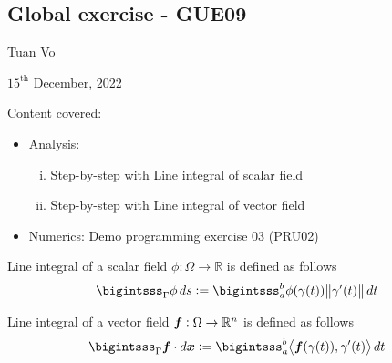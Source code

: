 \documentclass[12pt]{article}
\begin{document}
\begin{center}
	\section*{Global exercise - GUE09}
\end{center}
\begin{center}
	Tuan Vo
\end{center}
\begin{center}
	$15^{\text{th}}$ December, 2022
\end{center}
Content covered:
\begin{itemize}
	\item[\checkmark] Analysis:
		\begin{enumerate}[(i)]
			\item Step-by-step with Line integral of scalar field
			\item Step-by-step with Line integral of vector field
		\end{enumerate}
	\item[\checkmark] Numerics: Demo programming exercise 03 (PRU02)
\end{itemize}
\begin{recallboxed}
	\label{recall:scalar}
	Line integral of a scalar field $\phi: \Omega \to \mathbb{R}$ is defined as follows
	\begin{align}
		\bigintsss_{\Gamma} \phi \, ds 
		:= \bigintsss_{a}^{b} \phi(\gamma(t)) \big\| \gamma'(t) \big\| \, dt
	\end{align}
\end{recallboxed}
\begin{recallboxed}
	\label{recall:vector}
	Line integral of a vector field ${\boldsymbol{\mathnormal f}}: \Omega \to \mathbb{R}^{n}$ is defined as follows
	\begin{align}
		\bigintsss_{\Gamma} \Bf \cdot d\Bx 
		:= \bigintsss_{a}^{b} \big\langle \Bf(\gamma(t)), \gamma'(t) \big\rangle \, dt
	\end{align}
\end{recallboxed}
\clearpage
\end{document}
